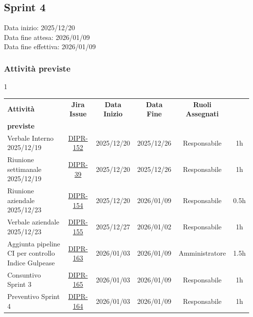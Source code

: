 \documentclass[a4paper,12pt]{article}
\begin{document}
\newpage

\subsection{Sprint 4}
Data inizio: 2025/12/20\\
Data fine attesa: 2026/01/09\\
Data fine effettiva: 2026/01/09

\subsubsection{Attività previste}

    \small
    \begin{spacing}{1}
    \begin{longtable}{|p{4cm}|c|c|c|c|c|}
        \hline
        \rowcolor{zpusgreen!30}
        \textbf{Attività} & \textbf{Jira Issue} & \textbf{Data Inizio} & \textbf{Data Fine} & \textbf{Ruoli Assegnati} & \begin{tabular}[c]{@{}c@{}} \textbf{Ore} \\ \textbf{previste} \end{tabular} \\
        \hline
        Verbale Interno 2025/12/19 & \href{https://7zpus.atlassian.net/browse/DIPR-152}{DIPR-152}& 2025/12/20 & 2025/12/26 & Responsabile & 1h \\
        \hline
        Riunione settimanale 2025/12/19 & \href{https://7zpus.atlassian.net/browse/DIPR-39}{DIPR-39} & 2025/12/20 & 2025/12/26 & Responsabile & 1h \\
        \hline
        Riunione aziendale 2025/12/23 & \href{https://7zpus.atlassian.net/browse/DIPR-154}{DIPR-154} & 2025/12/20 & 2026/01/09 & Responsabile & 0.5h \\
        \hline
        Verbale aziendale 2025/12/23 & \href{https://7zpus.atlassian.net/browse/DIPR-155}{DIPR-155}  & 2025/12/27 & 2026/01/02 & Responsabile & 1h \\ 
        \hline
        Aggiunta pipeline CI per controllo Indice Gulpease & \href{https://7zpus.atlassian.net/browse/DIPR-163}{DIPR-163} & 2026/01/03 & 2026/01/09 & Amministratore & 1.5h \\
        \hline
        Consuntivo Sprint 3 & \href{https://7zpus.atlassian.net/browse/DIPR-165}{DIPR-165} & 2026/01/03 & 2026/01/09 & Responsabile & 1h \\
        \hline
        Preventivo Sprint 4 & \href{https://7zpus.atlassian.net/browse/DIPR-164}{DIPR-164} & 2026/01/03 & 2026/01/09 & Responsabile & 1h\\
        \hline


\end{longtable}
\end{spacing}
\end{document}
